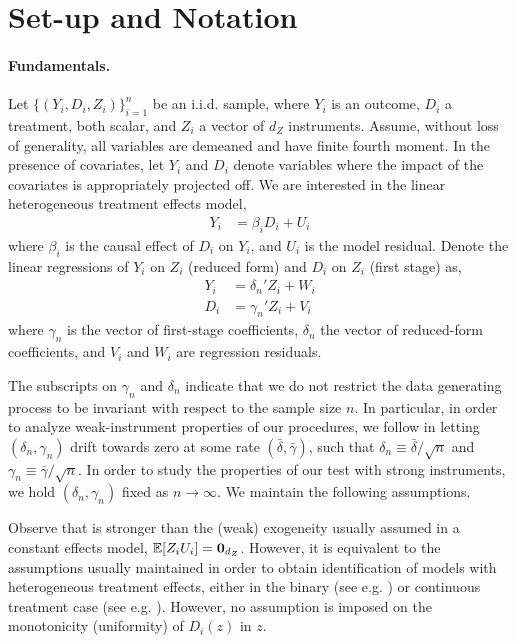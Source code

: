 \section{Set-up and Notation}

\label{sec:set-up-not}

\paragraph*{Fundamentals.}
Let \(\{(Y_i,D_i,Z_i)\}_{i=1}^n\) be an i.i.d. sample, where \(Y_i\) is an outcome, \(D_i\) a treatment, both scalar, and \(Z_i\) a vector of \(d_Z\) instruments. 
Assume, without loss of generality,  all variables are demeaned and have finite fourth moment.
In the presence of covariates, let \(Y_i\) and \(D_i\) denote variables where the impact of the covariates is appropriately projected off. 
We are interested in the linear  heterogeneous treatment effects model,
\begin{align}
       Y_i &= \beta_i D_i + U_i\label{eq:model-equation}
\end{align}
where \(\beta_i\) is the causal effect of \(D_i\) on \(Y_i\), and \(U_i\) is the model residual.
Denote the linear regressions of  \(Y_i\) on \(Z_i\)  (reduced form) and \(D_i\) on \(Z_i\)  (first stage) as,
\begin{align}
Y_i &=  \delta_n' Z_i + W_i \label{eq:reduced-form-equation}\\ 
D_i &= \gamma_n' Z_i + V_i \label{eq:first-stage-equation}  
\end{align}
where \(\gamma_n\) is the vector of first-stage coefficients,
\(\delta_n\) the vector of reduced-form coefficients, and \(V_i\) and \(W_i\)
are regression residuals. 

The subscripts on \(\gamma_n\) and \(\delta_n\) indicate that we do not restrict 
the data generating process to be invariant with respect to the sample size \(n\). In particular, in order to analyze weak-instrument properties of our procedures, we follow \cite{staigerInstrumentalVariablesRegression1997} in letting \((\delta_n, \gamma_n)\) drift towards zero at some rate \((\bar \delta, \bar \gamma)\), such that
   \(\delta_n \equiv  {\bar \delta}/{\sqrt{n}}\) and 
   \(\gamma_n \equiv  {\bar \gamma}/{\sqrt{n}} \).
In order to study the properties of our test with strong instruments, we hold \((\delta_n, \gamma_n)\) fixed as \(n\to\infty\).
We maintain the following assumptions.


\noindent
Observe that  is stronger than the (weak) exogeneity usually assumed in a constant effects model, \(\mathbb{E}[Z_iU_i]=\mathbf{0}_{d_Z}\). However, it is equivalent to the assumptions usually maintained
in order to obtain identification of models with heterogeneous treatment effects, either in the binary  (see e.g. \citealp{angristTwoStageLeastSquares1995}) or continuous treatment case (see e.g. \citealp{angristInterpretationInstrumentalVariables2000}). However, no assumption is imposed on  the monotonicity (uniformity) of \(D_i(z)\) in \(z\). 





